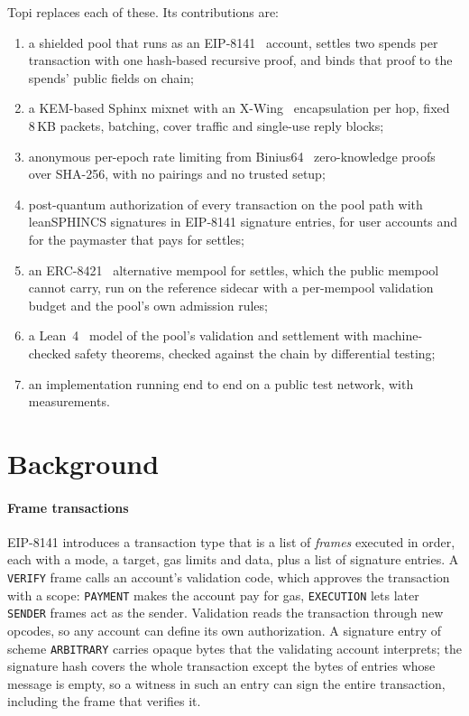 \documentclass[11pt,a4paper]{article}
\newcommand{\code}[1]{\texttt{\small #1}}
\begin{document}
Topi replaces each of these. Its contributions are:
\begin{enumerate}
  \item a shielded pool that runs as an EIP-8141~\cite{eip8141} account, settles two spends per
    transaction with one hash-based recursive proof, and binds that proof to the spends' public fields
    on chain;
  \item a KEM-based Sphinx mixnet with an X-Wing~\cite{xwing} encapsulation per hop, fixed 8\,KB packets,
    batching, cover traffic and single-use reply blocks;
  \item anonymous per-epoch rate limiting from Binius64~\cite{binius} zero-knowledge proofs over
    SHA-256, with no pairings and no trusted setup;
  \item post-quantum authorization of every transaction on the pool path with leanSPHINCS signatures in
    EIP-8141 signature entries, for user accounts and for the paymaster that pays for settles;
  \item an ERC-8421~\cite{erc8421} alternative mempool for settles, which the public mempool cannot
    carry, run on the reference sidecar with a per-mempool validation budget and the pool's own
    admission rules;
  \item a Lean~4~\cite{lean4} model of the pool's validation and settlement with machine-checked safety
    theorems, checked against the chain by differential testing;
  \item an implementation running end to end on a public test network, with measurements.
\end{enumerate}

\section{Background}

\paragraph{Frame transactions} EIP-8141 introduces a transaction type that is a list of
\emph{frames} executed in order, each with a mode, a target, gas limits and data, plus a list of
signature entries. A \code{VERIFY} frame calls an account's validation code, which approves the
transaction with a scope: \code{PAYMENT} makes the account pay for gas, \code{EXECUTION} lets later
\code{SENDER} frames act as the sender. Validation reads the transaction through new opcodes, so any
account can define its own authorization. A signature entry of scheme \code{ARBITRARY} carries opaque
bytes that the validating account interprets; the signature hash covers the whole transaction except the
bytes of entries whose message is empty, so a witness in such an entry can sign the entire transaction,
including the frame that verifies it.
\end{document}
